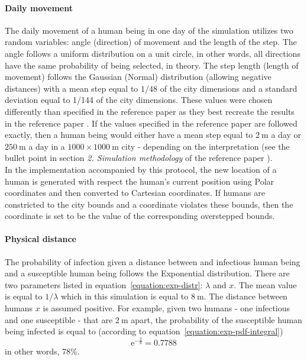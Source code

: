 \documentclass[a4paper]{article}
\begin{document}
\paragraph{Daily movement}
The daily movement of a human being in one day of the simulation utilizes two random variables: angle (direction) of movement and the length of the step. The angle follows a uniform distribution on a unit circle, in other words, all directions have the same probability of being selected, in theory. The step length (length of movement) follows the Gaussian (Normal) distribution (allowing negative distances) with a mean step equal to $1/48$ of the city dimensions and a standard deviation equal to 1/144 of the city dimensions. These values were chosen differently than specified in the reference paper as they best recreate the results in the reference paper \cite{Maltezos2021}. If the values specified in the reference paper \cite{Maltezos2021} are followed exactly, then a human being would either have a mean step equal to $2\:\textrm{m}$ a day or $250\:\textrm{m}$ a day in a $1000\times1000\:\textrm{m}$ city - depending on the interpretation (see the  bullet point in section \textit{2. Simulation methodology} of the reference paper \cite{Maltezos2021}).\\
In the implementation accompanied by this protocol, the new location of a human is generated with respect the human's current position using Polar coordinates and then converted to Cartesian coordinates. If humans are constricted to the city bounds and a coordinate violates these bounds, then the coordinate is set to be the value of the corresponding overstepped bounds.

\paragraph{Physical distance}
The probability of infection given a distance between and infectious human being and a susceptible human being follows the Exponential distribution. There are two parameters listed in equation~\eqref{equation:exp-distr}: $\lambda$ and $x$. The mean value is equal to $1/\lambda$ which in this simulation is equal to $8\:\textrm{m}$. The distance between humans $x$ is assumed positive. 
\noindent
For example, given two humans - one infectious and one susceptible - that are $2\:\textrm{m}$ apart, the probability of the susceptible human being infected is equal to (according to equation~\eqref{equation:exp-pdf-integral})
\begin{equation}
	\mathrm{e}^{- \frac{2}{8}} = 0.7788
\end{equation}
\noindent
in other words, 78\%. 
\end{document}
